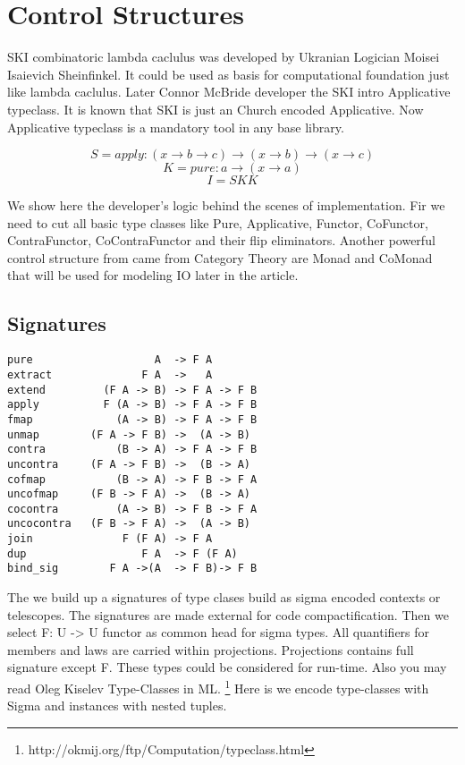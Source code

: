 \documentclass{article}
\begin{document}
\newpage
\section{Control Structures}

SKI combinatoric lambda caclulus was developed by Ukranian Logician
Moisei Isaievich Sheinfinkel. It could be used as basis for computational
foundation just like lambda caclulus. Later Connor McBride developer the SKI
intro Applicative typeclass. It is known that SKI is just an Church
encoded Applicative. Now Applicative typeclass is a mandatory tool in any base library.

\begin{equation}
 S = apply : (x \rightarrow b \rightarrow c) \rightarrow (x \rightarrow b) \rightarrow (x \rightarrow c)
\end{equation}
\begin{equation}
 K = pure  : a \rightarrow (x \rightarrow a)
\end{equation}
\begin{equation}
 I = S K K
\end{equation}

We show here the developer's logic behind the scenes of implementation. Fir we need
to cut all basic type classes like Pure, Applicative, Functor, CoFunctor,
ContraFunctor, CoContraFunctor and their flip eliminators. Another powerful control
structure from came from Category Theory are Monad and CoMonad that will be used
for modeling IO later in the article.

\subsection{Signatures}

\begin{lstlisting}[mathescape=true]
pure                   A  -> F A
extract              F A  ->   A
extend         (F A -> B) -> F A -> F B
apply          F (A -> B) -> F A -> F B
fmap             (A -> B) -> F A -> F B
unmap        (F A -> F B) ->  (A -> B)
contra           (B -> A) -> F A -> F B
uncontra     (F A -> F B) ->  (B -> A)
cofmap           (B -> A) -> F B -> F A
uncofmap     (F B -> F A) ->  (B -> A)
cocontra         (A -> B) -> F B -> F A
uncocontra   (F B -> F A) ->  (A -> B)
join              F (F A) -> F A
dup                  F A  -> F (F A)
bind_sig        F A ->(A  -> F B)-> F B
\end{lstlisting}

The we build up a signatures of type clases build as sigma encoded contexts or telescopes.
The signatures are made external for code compactification.
Then we select F: U -> U functor as common head for sigma types.
All quantifiers for members and laws are carried within projections.
Projections contains full signature except F. These types could be considered for run-time.
Also you may read Oleg Kiselev Type-Classes in ML. \footnote{http://okmij.org/ftp/Computation/typeclass.html}
Here is we encode type-classes with Sigma and instances with nested tuples.
\end{document}
